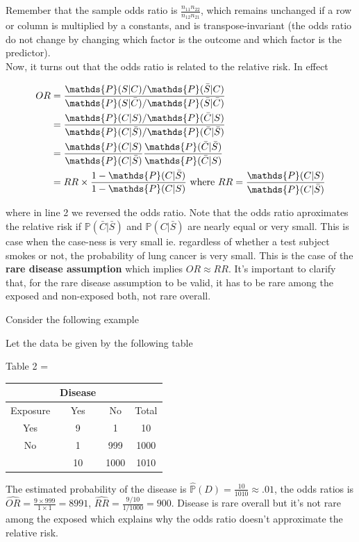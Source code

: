 \documentclass{homework}
\begin{document}
Remember that the sample odds ratio is $\frac{n_{11}n_{22}}{n_{12}n_{21}}$, which remains unchanged if a row or column is multiplied by a constants, and is transpose-invariant (the odds ratio do not change by changing which factor is the outcome and which factor is the predictor). \\

Now, it turns out that the odds ratio is related to the relative risk. In effect

\begin{align*}
    OR &= \frac{\mathds{P}(S|C)/\mathds{P}(\bar{S}|C)}{{\mathds{P}(S|\bar{C})/\mathds{P}(\bar{S}|\bar{C})}} \\
    &= \frac{\mathds{P}(C|S)/\mathds{P}(\bar{C}|S)}{{\mathds{P}(C|\bar{S})/\mathds{P}(\bar{C}|\bar{S})}} \\
    &= \frac{\mathds{P}(C|S)}{\mathds{P}(C|\bar{S})} \frac{\mathds{P}(\bar{C}|\bar{S})}{\mathds{P}(\bar{C}|S)}\\
    &= RR \times \frac{1- \mathds{P}(C | \bar{S})}{1- \mathds{P}(C | {S})} \textnormal{ where } RR =   \frac{\mathds{P}(C|S)}{\mathds{P}(C|\bar{S})}
\end{align*}

where in line 2 we reversed the odds ratio. Note that the odds ratio aproximates the relative risk if $\mathds{P}(\bar{C}|\bar{S})$ and $\mathds{P}(C|\bar{S})$ are nearly equal or very small. This is case when the case-ness is very small ie. regardless of whether a test subject smokes or not, the probability of lung cancer is very small. This is the case of the \textbf{rare disease assumption} which implies $OR \approx RR$. It's important to clarify that, for the rare disease assumption to be valid, it has to be rare among the exposed and non-exposed both, not rare overall.

Consider the following example 

\begin{tcolorbox}[title=Example of Rare Disease Assumption]

Let the data be given by the following table

\begin{center}
Table 2 = 
\begin{tabular}{ |c|c|c|c| } 
& Disease & \\
\hline
Exposure & Yes & No & Total \\
\hline
Yes & 9 & 1 & 10 \\ 
No & 1 & 999 & 1000\\  
\hline 
& 10 & 1000 & 1010
\end{tabular}
\end{center}

The estimated probability of the disease is $\hat{\mathds{P}}(D) = \frac{10}{1010}\approx .01$, the odds ratios is $\hat{OR}=\frac{9\times 999}{1 \times 1} = 8991$, $\hat{RR}=\frac{9/10}{1/1000} = 900$. Disease is rare overall but it's not rare among the exposed which explains why the odds ratio doesn't approximate the relative risk. 
\end{tcolorbox}
\end{document}
